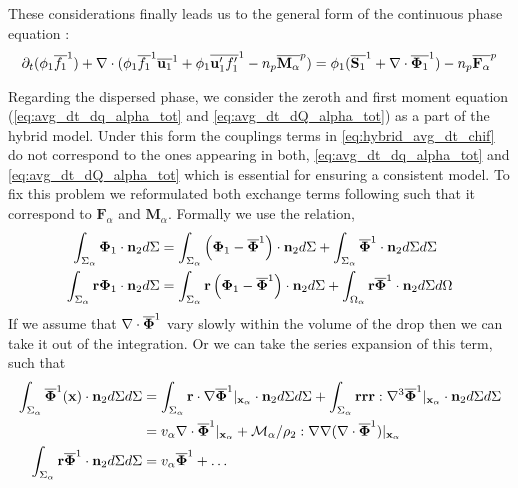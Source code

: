 These considerations finally leads us to the general form of the continuous phase equation : 
\begin{equation}
    \partial_t (\phi_1\overline{ f_1}^1)
    + \mathbf{\nabla} \cdot (\phi_1\overline{ f_1}^1\overline{ \textbf{u}_1}^1
    + \phi_1 \overline{\textbf{u}_1'f_1'}^1
    - n_p\overline{\textbf{M}_\alpha}^{p} )
    = 
    \phi_1(\overline{ \textbf{S}_1}^1  +\mathbf{\nabla} \cdot \overline{ \mathbf{\Phi}_1}^1)
    - n_p\overline{\textbf{F}_\alpha}^{p} 
    \label{eq:hybrid_avg_dt_chif}
\end{equation}

Regarding the dispersed phase, we consider the zeroth and first moment equation (\ref{eq:avg_dt_dq_alpha_tot} and \ref{eq:avg_dt_dQ_alpha_tot}) as  a part of the hybrid model.
Under this form the couplings terms in \ref{eq:hybrid_avg_dt_chif} do not correspond to the ones appearing in both, \ref{eq:avg_dt_dq_alpha_tot} and \ref{eq:avg_dt_dQ_alpha_tot} which is essential for ensuring a consistent model. 
To fix this problem we reformulated both exchange terms following \citet{zhang1997momentum} such that it correspond to $\mathbf{F}_\alpha$ and $\textbf{M}_\alpha$. 
Formally we use the relation,
\begin{align*}
    \int_{\Sigma_\alpha}
        \mathbf{\Phi}_1 
    \cdot \textbf{n}_2d\Sigma 
    &= 
    \int_{\Sigma_\alpha}
    \left(
        \mathbf{\Phi}_1 
        - \overline{\mathbf{\Phi}}^1
    \right)  
    \cdot \textbf{n}_2d\Sigma
    + \int_{\Sigma_\alpha}
    \overline{\mathbf{\Phi}}^1
    \cdot \textbf{n}_2d\Sigma
    d\Sigma\\
    \int_{\Sigma_\alpha}
        \textbf{r}\mathbf{\Phi}_1 
    \cdot \textbf{n}_2d\Sigma 
    &= 
    \int_{\Sigma_\alpha}
    \textbf{r}\left(
        \mathbf{\Phi}_1 
        - \overline{\mathbf{\Phi}}^1
    \right)  
    \cdot \textbf{n}_2d\Sigma
    + \int_{\Omega_\alpha}
    \textbf{r}  \overline{\mathbf{\Phi}}^1
    \cdot \textbf{n}_2d\Sigma
    d\Omega
\end{align*}
If we assume that $\mathbf{\nabla} \cdot \overline{\mathbf{\Phi}}^1$ vary slowly within the volume of the drop then we can take it out of the integration.
Or we can take the series expansion of this term, such that  
\begin{align*}
    \int_{\Sigma_\alpha}
    \overline{\mathbf{\Phi}}^1(\textbf{x})
    \cdot \textbf{n}_2d\Sigma
    d\Sigma
    &= 
    \int_{\Sigma_\alpha}
    \textbf{r} \cdot \mathbf{\nabla}\overline{\mathbf{\Phi}}^1|_{\textbf{x}_\alpha}
    \cdot \textbf{n}_2d\Sigma
    d\Sigma
    + \int_{\Sigma_\alpha}
    \textbf{rrr} : \mathbf{\nabla}^3\overline{\mathbf{\Phi}}^1|_{\textbf{x}_\alpha}
    \cdot \textbf{n}_2d\Sigma
d\Sigma
\\
&= 
v_\alpha
\mathbf{\nabla}\cdot\overline{\mathbf{\Phi}}^1|_{\textbf{x}_\alpha}
+ \mathcal{M}_\alpha/\rho_2 :  
\mathbf{\nabla}\mathbf{\nabla}(\mathbf{\nabla}\cdot\overline{\mathbf{\Phi}}^1)|_{\textbf{x}_\alpha}\\
\int_{\Sigma_\alpha}
    \textbf{r}  \overline{\mathbf{\Phi}}^1
    \cdot \textbf{n}_2d\Sigma
    d\Sigma
    &= v_\alpha \overline{\mathbf{\Phi}}^1 + \ldots
\end{align*}
